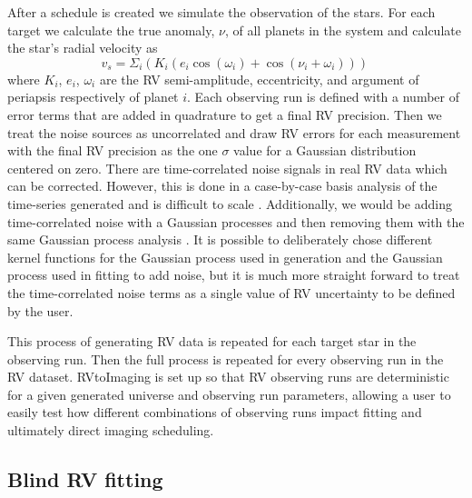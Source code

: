 After a schedule is created we simulate the observation of the stars. For each
target we calculate the true anomaly, $\nu$, of all planets in the system and
calculate the star's radial velocity as 
\begin{equation}
v_s = \Sigma_i \left(K_i \left(e_i
\cos(\omega_i) + \cos(\nu_i + \omega_i)\right)\right) \,
  \label{eq:system_rv}
\end{equation}
where $K_i$, $e_i$,
$\omega_i$ are the RV semi-amplitude, eccentricity, and argument of periapsis
respectively of planet $i$. Each observing run is defined with a number of
error terms that are added in quadrature to get a final RV precision. Then we
treat the noise sources as uncorrelated and draw RV errors for each measurement
with the final RV precision as the one $\sigma$ value for a Gaussian
distribution centered on zero. There are time-correlated noise signals in real
RV data which can be corrected. However, this is done in a case-by-case basis
analysis of the time-series generated and is difficult to scale
\citep{guptaTargetPrioritization2021}. Additionally, we would be adding
time-correlated noise with a Gaussian processes and then removing them with the
same Gaussian process analysis \citep{aigrainGaussianProcess2022}. It is
possible to deliberately chose different kernel functions for the Gaussian
process used in generation and the Gaussian process used in fitting to add
noise, but it is much more straight forward to treat the time-correlated noise
terms as a single value of RV uncertainty to be defined by the user.

This process of generating RV data is repeated for each target star in the
observing run. Then the full process is repeated for every observing run in the
RV dataset. RVtoImaging is set up so that RV observing runs are deterministic
for a given generated universe and observing run parameters, allowing a user to
easily test how different combinations of observing runs impact fitting and
ultimately direct imaging scheduling.

\subsection{Blind RV fitting}

